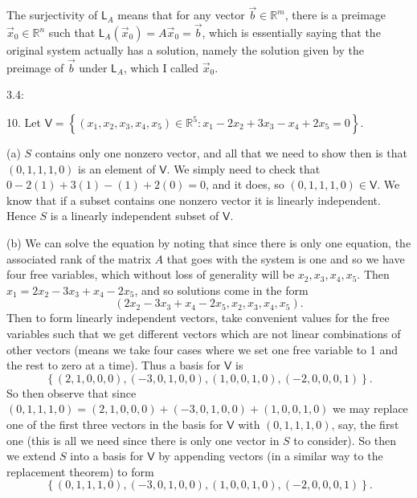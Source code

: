 \documentclass[11pt]{article}
\newcommand{\cbr}[1]{\left\{#1\right\}}
\begin{document}
The surjectivity of $\mathsf{L}_A$ means that for any vector $\vec{b}\in\mathbb{R}^m$, there is a preimage $\vec{x}_0\in\mathbb{R}^n$ such that $\mathsf{L}_A(\vec{x}_0) = A\vec{x}_0 = \vec{b}$, which is essentially saying that the original system actually has a solution, namely the solution given by the preimage of $\vec{b}$ under $\mathsf{L}_A$, which I called $\vec{x}_0$.

3.4:

10. Let $\mathsf{V} = \cbr{(x_1,x_2,x_3,x_4,x_5)\in\mathbb{R}^5 : x_1 - 2x_2 + 3x_3 - x_4 + 2x_5 = 0}$. 

(a) $S$ contains only one nonzero vector, and all that we need to show then is that $(0,1,1,1,0)$ is an element of $\mathsf{V}$. We simply need to check that $0 - 2(1) + 3(1) - (1) + 2(0) = 0$, and it does, so $(0,1,1,1,0)\in\mathsf{V}$. We know that if a subset contains one nonzero vector it is linearly independent. Hence $S$ is a linearly independent subset of $\mathsf{V}$.

(b) We can solve the equation by noting that since there is only one equation, the associated rank of the matrix $A$ that goes with the system is one and so we have four free variables, which without loss of generality will be $x_2,x_3,x_4,x_5$. Then $x_1 = 2x_2 - 3x_3 + x_4 - 2x_5$, and so solutions come in the form $$(2x_2 - 3x_3 + x_4 - 2x_5, x_2,x_3,x_4,x_5).$$ Then to form linearly independent vectors, take convenient values for the free variables such that we get different vectors which are not linear combinations of other vectors (means we take four cases where we set one free variable to 1 and the rest to zero at a time). Thus a basis for $\mathsf{V}$ is $$\cbr{(2,1,0,0,0),(-3,0,1,0,0),(1,0,0,1,0),(-2,0,0,0,1)}.$$ So then observe that since $(0,1,1,1,0) = (2,1,0,0,0) + (-3,0,1,0,0) + (1,0,0,1,0)$ we may replace one of the first three vectors in the basis for $\mathsf{V}$ with $(0,1,1,1,0)$, say, the first one (this is all we need since there is only one vector in $S$ to consider). So then we extend $S$ into a basis for $\mathsf{V}$ by appending vectors (in a similar way to the replacement theorem) to form $$\cbr{(0,1,1,1,0), (-3,0,1,0,0),(1,0,0,1,0),(-2,0,0,0,1)}.$$
\end{document}
